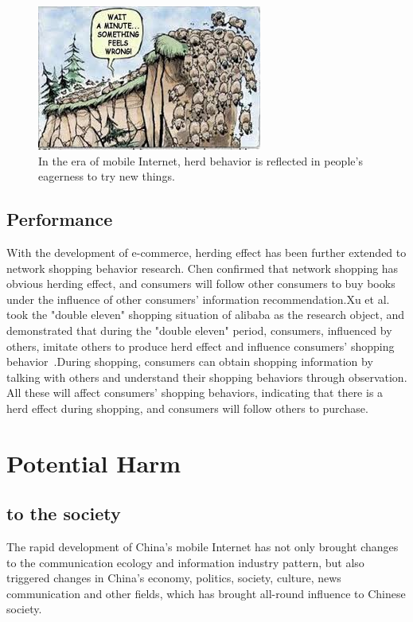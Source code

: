 \documentclass{elsarticle}
\begin{document}
\begin{figure}[ht!]
	\centering
	\includegraphics[trim=0in 0in 0in 0in,clip,width=0.75\columnwidth]{herdeffect.jpg}
	\caption{In the era of mobile Internet, herd behavior is reflected in people's eagerness to try new things.\label{fig:herdeffect}}
\end{figure}


\subsection{Performance}

With the development of e-commerce, herding effect has been further extended to network shopping behavior research. Chen confirmed that network shopping has obvious herding effect, and consumers will follow other consumers to buy books under the influence of other consumers' information recommendation.Xu et al. took the "double eleven" shopping situation of alibaba as the research object, and demonstrated that during the "double eleven" period, consumers, influenced by others, imitate others to produce herd effect and influence consumers' shopping behavior~\cite{wgheyang}.During shopping, consumers can obtain shopping information by talking with others and understand their shopping behaviors through observation. All these will affect consumers' shopping behaviors, indicating that there is a herd effect during shopping, and consumers will follow others to purchase.


\section{Potential Harm}\label{sec:harm}

\subsection{to the society}
The rapid development of China's mobile Internet has not only brought changes to the communication ecology and information industry pattern, but also triggered changes in China's economy, politics, society, culture, news communication and other fields, which has brought all-round influence to Chinese society.
\end{document}
